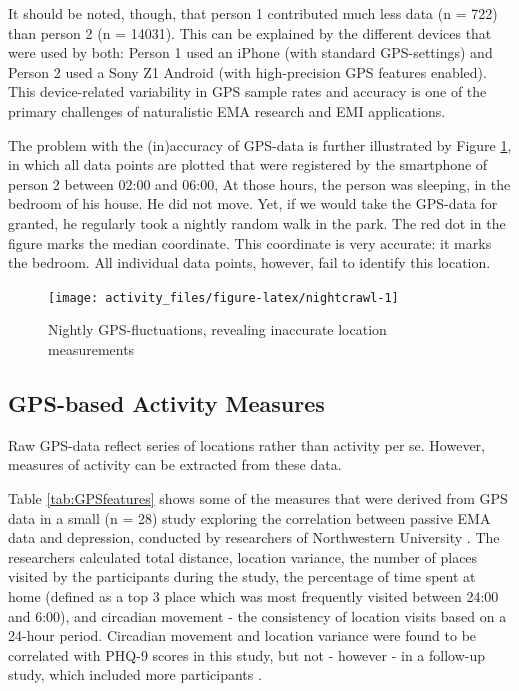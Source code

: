 \documentclass[]{book}
\begin{document}
It should be noted, though, that person 1 contributed much less data (n
= 722) than person 2 (n = 14031). This can be explained by the different
devices that were used by both: Person 1 used an iPhone (with standard
GPS-settings) and Person 2 used a Sony Z1 Android (with high-precision
GPS features enabled). This device-related variability in GPS sample
rates and accuracy is one of the primary challenges of naturalistic EMA
research and EMI applications.

The problem with the (in)accuracy of GPS-data is further illustrated by
Figure \ref{fig:nightcrawl}, in which all data points are plotted that
were registered by the smartphone of person 2 between 02:00 and 06:00,
At those hours, the person was sleeping, in the bedroom of his house. He
did not move. Yet, if we would take the GPS-data for granted, he
regularly took a nightly random walk in the park. The red dot in the
figure marks the median coordinate. This coordinate is very accurate: it
marks the bedroom. All individual data points, however, fail to identify
this location.

\begin{figure}

{\centering \texttt{[image: activity\_files/figure-latex/nightcrawl-1]} 

}

\caption{Nightly GPS-fluctuations, revealing inaccurate location measurements}\label{fig:nightcrawl}
\end{figure}

\subsection{GPS-based Activity
Measures}\label{gps-based-activity-measures}

Raw GPS-data reflect series of locations rather than activity per se.
However, measures of activity can be extracted from these data.

Table \ref{tab:GPSfeatures} shows some of the measures that were derived
from GPS data in a small (n = 28) study exploring the correlation
between passive EMA data and depression, conducted by researchers of
Northwestern University \citep{Saeb2015}. The researchers calculated
total distance, location variance, the number of places visited by the
participants during the study, the percentage of time spent at home
(defined as a top 3 place which was most frequently visited between
24:00 and 6:00), and circadian movement - the consistency of location
visits based on a 24-hour period. Circadian movement and location
variance were found to be correlated with PHQ-9 scores in this study,
but not - however - in a follow-up study, which included more
participants \citep{Saeb2017}.
\end{document}
